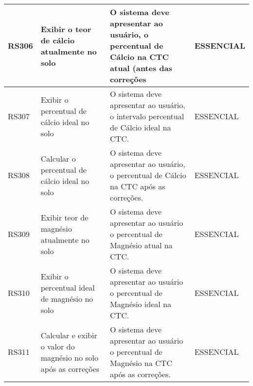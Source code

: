 \begin{table}
\begin{tabular}{|p{2cm}|p{4cm}|p{6cm}|p{2cm}|}
RS306 & Exibir o teor de cálcio atualmente no solo                                       & O sistema deve apresentar ao usuário, o percentual de Cálcio na CTC atual (antes das correções                                                                                                                                                                                                 & ESSENCIAL   \\ 
\hline
RS307 & Exibir o percentual de cálcio ideal no solo                                      & O sistema deve apresentar ao usuário, o intervalo percentual de Cálcio ideal na CTC.                                                                                                                                                                                                           & ESSENCIAL   \\ 
\hline
RS308 & Calcular o percentual de cálcio ideal no solo                           & O sistema deve apresentar ao usuário, o percentual de Cálcio na CTC após as correções.                                                                                                                                                                                                         & ESSENCIAL   \\ 
\hline
RS309 & Exibir teor de magnésio atualmente no solo                                       & O sistema deve apresentar ao usuário o percentual de Magnésio atual na CTC.                                                                                                                                                                                                                    & ESSENCIAL   \\ 
\hline
RS310 & Exibir o percentual ideal de magnésio no solo                                    & O sistema deve apresentar ao usuário o percentual de Magnésio ideal na CTC.                                                                                                                                                                                                                    & ESSENCIAL   \\ 
\hline
RS311 & Calcular e exibir o valor do magnésio no solo após as correções                  & O sistema deve apresentar ao usuário o percentual de Magnésio na CTC após as correções.                                                                                                                                                                                                        & ESSENCIAL   \\ 

\end{tabular}
\end{table}
